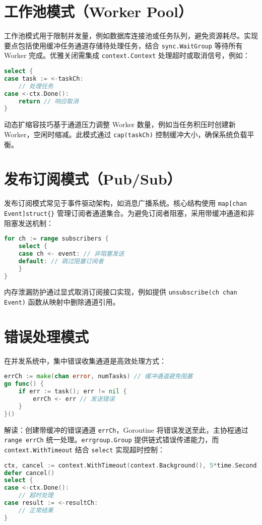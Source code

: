 \section{工作池模式（Worker Pool）}
工作池模式用于限制并发量，例如数据库连接池或任务队列，避免资源耗尽。实现要点包括使用缓冲任务通道存储待处理任务，结合 \texttt{sync.WaitGroup} 等待所有 Worker 完成。优雅关闭需集成 \texttt{context.Context} 处理超时或取消信号，例如：\par
\begin{lstlisting}[language=go]
select {
case task := <-taskCh:
    // 处理任务
case <-ctx.Done():
    return // 响应取消
}
\end{lstlisting}
动态扩缩容技巧基于通道压力调整 Worker 数量，例如当任务积压时创建新 Worker，空闲时缩减。此模式通过 \texttt{cap(taskCh)} 控制缓冲大小，确保系统负载平衡。\par
\section{发布订阅模式（Pub/Sub）}
发布订阅模式常见于事件驱动架构，如消息广播系统。核心结构使用 \texttt{map[chan Event]struct\{{}\}{}} 管理订阅者通道集合。为避免订阅者阻塞，采用带缓冲通道和非阻塞发送机制：\par
\begin{lstlisting}[language=go]
for ch := range subscribers {
    select {
    case ch <- event: // 非阻塞发送
    default: // 跳过阻塞订阅者
    }
}
\end{lstlisting}
内存泄漏防护通过显式取消订阅接口实现，例如提供 \texttt{unsubscribe(ch chan Event)} 函数从映射中删除通道引用。\par
\section{错误处理模式}
在并发系统中，集中错误收集通道是高效处理方式：\par
\begin{lstlisting}[language=go]
errCh := make(chan error, numTasks) // 缓冲通道避免阻塞
go func() {
    if err := task(); err != nil {
        errCh <- err // 发送错误
    }
}()
\end{lstlisting}
解读：创建带缓冲的错误通道 \texttt{errCh}，Goroutine 将错误发送至此，主协程通过 \texttt{range errCh} 统一处理。\texttt{errgroup.Group} 提供链式错误传递能力，而 \texttt{context.WithTimeout} 结合 \texttt{select} 实现超时控制：\par
\begin{lstlisting}[language=go]
ctx, cancel := context.WithTimeout(context.Background(), 5*time.Second)
defer cancel()
select {
case <-ctx.Done():
    // 超时处理
case result := <-resultCh:
    // 正常结果
}
\end{lstlisting}
